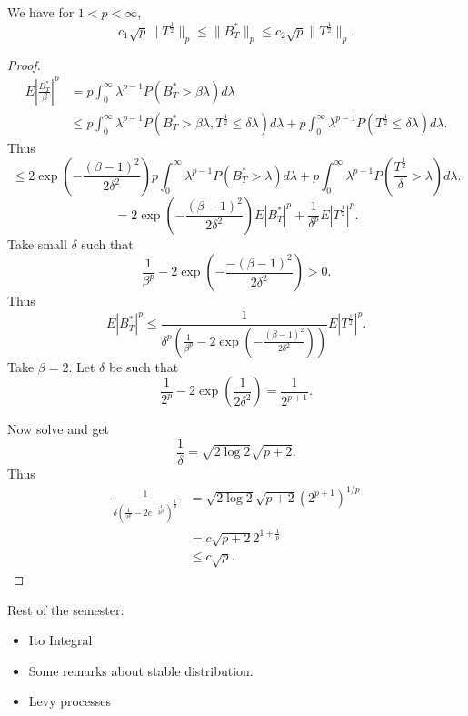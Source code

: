
We have for $1 < p < \infty $,
\[
	c_1 \sqrt{p} \|T^{\frac{1}{2}}\|_p \le 
	\|B_T^*\|_p
	\le c_2 \sqrt{p}  \|T^{\frac{1}{2}}\|_p
.\] 

\begin{proof}
	\begin{align*}
		E \left| \frac{B_T^*}{\beta} \right| ^p
		&= p \int _0^\infty \lambda^{p-1} P\left( B_T^* > \beta \lambda \right) d \lambda \\
		&\leq p \int _0 ^\infty  \lambda^{p - 1}P\left( B_T^* > \beta \lambda, T^{\frac{1}{2}} \le  \delta \lambda \right) d \lambda 
		+ p \int _0 ^\infty  \lambda^{p - 1} P\left( T^{\frac{1}{2}} \le  \delta \lambda \right) d \lambda 
	.\end{align*}
	Thus
	\[
		\le  2 \exp\left( - \frac{(\beta - 1)^2}{2 \delta^2}	 \right) 
		p \int _0^\infty \lambda^{p - 1} P\left( B_T^* > \lambda \right) d \lambda + p \int _0^\infty \lambda^{p - 1} P\left( \frac{T^{\frac{1}{2}}}{\delta} > \lambda \right) d \lambda
	.\] 
	\[
		= 2 \exp\left(  - \frac{(\beta - 1)^2}{2 \delta^2} \right) E|B_T^*|^p + \frac{1}{\delta^p} E|T^{\frac{1}{2}}|^p
	.\] 
	Take small $\delta$ such that
	\[
		\frac{1}{\beta^p} - 2 \exp\left( - \frac{- \left( \beta - 1 \right) ^2}{2 \delta^2} \right) > 0
	.\] 
	Thus
	\[
		E|B_T^*|^p \le  \frac{1}{\delta^p \left( \frac{1}{\beta^p} - 2 \exp\left( - \frac{(\beta - 1)^2}{ 2 \delta^2} \right)  \right) } 
		E|T^{\frac{1}{2}}|^p
	.\]  
	Take $\beta = 2$.
	Let $\delta$ be such that
	\[
		\frac{1}{2^p} - 2 \exp\left( \frac{1}{2 \delta^2} \right)  = \frac{1}{2^{p + 1}}
	.\] 

	Now solve and get
	\[
		\frac{1}{\delta} = \sqrt{2 \log 2}  \sqrt{p + 2} 
	.\] 
	Thus
	\begin{align*}
		\frac{1}{\delta \left( \frac{1}{2^p} - 2 e^{-\frac{1}{ 2 \delta^2}} \right) ^{\frac{1}{p}}}
		&= \sqrt{2 \log  2} \sqrt{p + 2} \left( 2^{p + 1} \right) ^{1 / p} \\
		&= c \sqrt{p + 2}  2^{ 1 + \frac{1}{p}} \\
		&\le  c \sqrt{p} 
	.\end{align*}

\end{proof}

Rest of the semester: 
\begin{itemize}
	\item Ito Integral
	\item Some remarks about stable distribution.
	\item Levy processes
\end{itemize}

